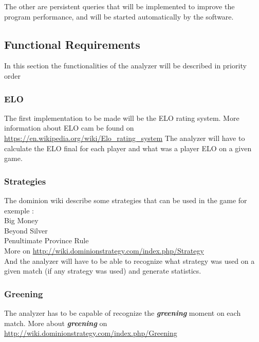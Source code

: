 \documentclass{scrreprt}
\begin{document}
The other are persistent queries that will be implemented to improve the program
performance, and will be started automatically by the software.


\subsection{Functional Requirements}


In this section the functionalities of the analyzer will be described in
priority order

\subsubsection{ELO}
The first implementation to be made will be the ELO rating system.
More information about ELO cam be found on \url{https://en.wikipedia.org/wiki/Elo_rating_system}
The analyzer will have to calculate the ELO final for each player and what was a
player ELO on a given game.

\subsubsection{Strategies}
The dominion wiki describe some strategies that can be used in the game for
exemple :\\
Big Money\\
Beyond Silver \\
Penultimate Province Rule \\
More on \url{http://wiki.dominionstrategy.com/index.php/Strategy}\\

And the analyzer will have to be able to recognize what strategy was used on a
given match (if any strategy was used) and generate statistics.


\subsubsection{Greening}
The analyzer has to be capable of recognize the \textit{\textbf{greening}} moment on each match.
More about \textit{\textbf{greening}} on \url{http://wiki.dominionstrategy.com/index.php/Greening}
\end{document}

